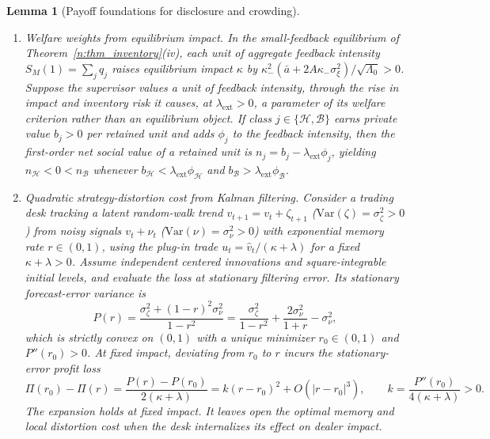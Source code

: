 \documentclass[11pt,letterpaper]{article}
\newtheorem{lemma}[theorem]{Lemma}
\theoremstyle{definition}
\newcommand{\Var}{\mathrm{Var}}
\begin{document}
\begin{lemma}[Payoff foundations for disclosure and crowding]\label{lem:micro}
\begin{enumerate}
  \item[(i)] \emph{Welfare weights from equilibrium impact.} In the small-feedback equilibrium of Theorem~\ref{n:thm_inventory}(iv), each unit of aggregate feedback intensity $S_M(1) = \sum_j q_j$ raises equilibrium impact $\kappa$ by $\kappa_-^2(\bar{a} + 2A\kappa_-\sigma_\xi^2)/\sqrt{\Lambda_0} > 0$. Suppose the supervisor values a unit of feedback intensity, through the rise in impact and inventory risk it causes, at $\lambda_{\mathrm{ext}} > 0$, a parameter of its welfare criterion rather than an equilibrium object. If class $j \in \{\mathcal{H}, \mathcal{B}\}$ earns private value $b_j > 0$ per retained unit and adds $\phi_j$ to the feedback intensity, then the first-order net social value of a retained unit is $n_j = b_j - \lambda_{\mathrm{ext}} \phi_j$, yielding $n_{\mathcal{H}} < 0 < n_{\mathcal{B}}$ whenever $b_{\mathcal{H}} < \lambda_{\mathrm{ext}}\phi_{\mathcal{H}}$ and $b_{\mathcal{B}} > \lambda_{\mathrm{ext}}\phi_{\mathcal{B}}$.
  \item[(ii)] \emph{Quadratic strategy-distortion cost from Kalman filtering.} Consider a trading desk tracking a latent random-walk trend $v_{t+1} = v_t + \zeta_{t+1}$ ($\Var(\zeta) = \sigma_\zeta^2 > 0$) from noisy signals $v_t + \nu_t$ ($\Var(\nu) = \sigma_\nu^2 > 0$) with exponential memory rate $r \in (0, 1)$, using the plug-in trade $u_t=\hat v_t/(\kappa+\lambda)$ for a fixed $\kappa+\lambda>0$. Assume independent centered innovations and square-integrable initial levels, and evaluate the loss at stationary filtering error. Its stationary forecast-error variance is
  \[
    P(r) = \frac{\sigma_\zeta^2 + (1 - r)^2 \sigma_\nu^2}{1 - r^2}
         = \frac{\sigma_\zeta^2}{1 - r^2} + \frac{2\sigma_\nu^2}{1 + r} - \sigma_\nu^2,
  \]
  which is strictly convex on $(0, 1)$ with a unique minimizer $r_0 \in (0, 1)$ and $P''(r_0) > 0$. At fixed impact, deviating from $r_0$ to $r$ incurs the stationary-error profit loss
  \[
    \Pi(r_0) - \Pi(r) = \frac{P(r) - P(r_0)}{2(\kappa + \lambda)}
    = k (r - r_0)^2 + O\!\left(|r - r_0|^3\right),
    \qquad k = \frac{P''(r_0)}{4(\kappa + \lambda)} > 0.
  \]
  The expansion holds at fixed impact. It leaves open the optimal memory and local distortion cost when the desk internalizes its effect on dealer impact.
\end{enumerate}
\end{lemma}
\end{document}
